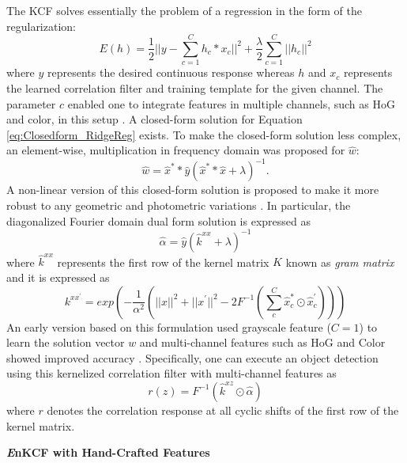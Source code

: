 \documentclass[10pt,twocolumn,letterpaper]{article}
\begin{document}
The KCF solves essentially the problem of a regression in the form of
the regularization:
\begin{equation}
E(h) = \frac{1}{2}||y-\sum_{c=1}^{C}h_{c}*x_{c}||^{2} + \frac{\lambda}{2}\sum_{c=1}^{C}||h_{c}||^{2}
\label{eq:Closedform_RidgeReg}
\end{equation}
where $y$ represents the desired continuous response whereas $h$ and
$x_{c}$ represents the learned correlation filter and training
template for the given channel. The parameter $c$ enabled one to
integrate features in multiple channels, such as HoG and color, in
this setup \cite{henriques2015high,galoogahi2013multi}. A closed-form
solution for Equation \ref{eq:Closedform_RidgeReg} exists. To make the
closed-form solution less complex, an element-wise, multiplication in
frequency domain was proposed for $\hat{w}$:
\begin{equation}
\hat{w} = \hat{x}^{*}*\hat{y}(\hat{x}^{*}*\hat{x}+\lambda)^{-1}.
\label{eq:DiagonalizedPrimalSolution}
\end{equation}
A non-linear version of this closed-form solution is proposed to make
it more robust to any geometric and photometric variations
\cite{henriques2015high}. In particular, the diagonalized Fourier
domain dual form solution is expressed as
\begin{equation}
\hat{\alpha} = \hat{y}(\hat{k}^{xx}+\lambda)^{-1}
\label{eq:FourierDualDomainSolution}
\end{equation}
where $\hat{k}^{xx}$ represents the first row of the kernel matrix $K$
known as \textit{gram matrix} and it is expressed as
\begin{equation}
k^{xx^{'}} = exp(-\dfrac{1}{\alpha^{2}}(||x||^{2}+||x^{'}||^{2}-2F^{-1}(\sum^{C}_{c}\hat{x}_{c}^{*}\odot \hat{x}_{c}^{'})))
\label{eq:GaussianCorrelationSingleChannel}
\end{equation}
An early version based on this formulation used grayscale feature
($C=1$) to learn the solution vector $w$ and multi-channel features
such as HoG and Color showed improved accuracy
\cite{henriques2015high,galoogahi2013multi,tang2015multi,ma2015long,bibi2015multi}. Specifically,
one can execute an object detection using this kernelized correlation
filter with multi-channel features as
\begin{equation}
r(z) = F^{-1}(\hat{k}^{xz} \odot \hat{\alpha})
\end{equation}
where $r$ denotes the correlation response at all cyclic shifts of the
first row of the kernel matrix.

\textbf{{\it E}nKCF with Hand-Crafted Features} 
\end{document}
